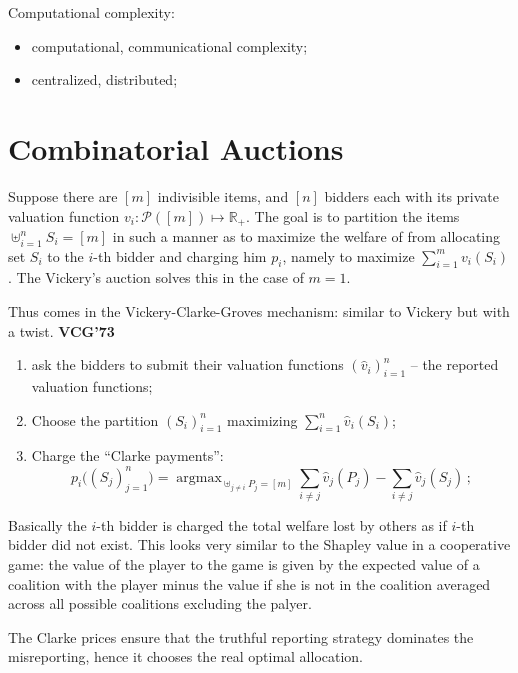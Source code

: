 \documentclass[a4paper]{article}
\newcommand{\Real}{\mathbb{R}}
\newcommand{\argmax}{\mathop{\text{argmax}}}
\begin{document}
Computational complexity: \begin{itemize}
	\item computational, communicational complexity;
	\item centralized, distributed;
\end{itemize}

\section{Combinatorial Auctions} %
\label{sec:combinatorial_auctions}

Suppose there are $[m]$ indivisible items, and $[n]$ bidders each with its private
valuation function $v_i:\mathcal{P}([m]) \mapsto \Real_+$. The goal is to partition
the items $\uplus_{i=1}^n S_i = [m]$ in such a manner as to maximize the welfare of
from allocating set $S_i$ to the $i$-th bidder and charging him $p_i$, namely to maximize
$\sum_{i=1}^m v_i(S_i)$. The Vickery's auction solves this in the case of $m=1$.

Thus comes in the Vickery-Clarke-Groves mechanism: similar to Vickery but with a twist.
\textbf{VCG'73}
\begin{enumerate}
	\item ask the bidders to submit their valuation functions $(\hat{v}_i)_{i=1}^n$
	-- the reported valuation functions;
	\item Choose the  partition $(S_i)_{i=1}^n$ maximizing $\sum_{i=1}^n \hat{v}_i(S_i)$;
	\item Charge the ``Clarke payments'':
	\begin{equation}
		p_i\bigl((S_j)_{j=1}^n\bigr)
			= \argmax_{\uplus_{j\neq i} P_j = [m]}
				\sum_{i\neq j} \hat{v}_j(P_j) - \sum_{i\neq j} \hat{v}_j(S_j) \,;
	\end{equation}
\end{enumerate}
Basically the $i$-th bidder is charged the total welfare lost by others as if $i$-th
bidder did not exist. This looks very similar to the Shapley value in a cooperative
game: the value of the player to the game is given by the expected value of a coalition
with the player minus the value if she is not in the coalition averaged across all
possible coalitions excluding the palyer.

The Clarke prices ensure that the truthful reporting strategy dominates the misreporting,
hence it chooses the real optimal allocation.
\end{document}

